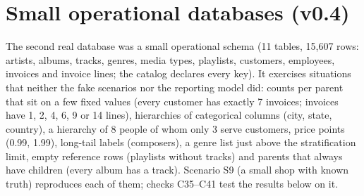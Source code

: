 \section{Small operational databases (v0.4)}\label{sec:v04}
The second real database was a small operational schema (11 tables, 15{,}607 rows: artists, albums, tracks, genres, media types, playlists, customers, employees, invoices and invoice lines; the catalog declares every key). It exercises situations that neither the fake scenarios nor the reporting model did: counts per parent that sit on a few fixed values (every customer has exactly 7 invoices; invoices have 1, 2, 4, 6, 9 or 14 lines), hierarchies of categorical columns (city, state, country), a hierarchy of 8 people of whom only 3 serve customers, price points (0.99, 1.99), long-tail labels (composers), a genre list just above the stratification limit, empty reference rows (playlists without tracks) and parents that always have children (every album has a track). Scenario S9 (a small shop with known truth) reproduces each of them; checks C35--C41 test the results below on it.


